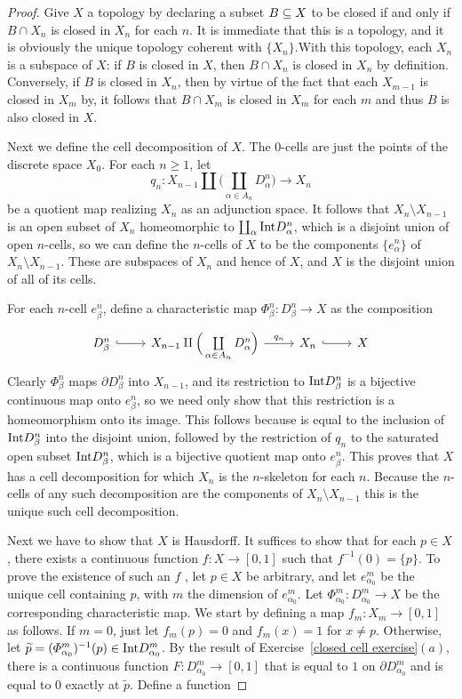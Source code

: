 \begin{proof}
Give $X$ a topology by declaring a subset $B\subseteq X$ to be closed if and only if
$B\cap X_n$ is closed in $X_n$ for each $n$. It is immediate that this is a topology, and it is obviously the unique topology coherent with $\{X_n\}$.With this topology, each $X_n$ is a subspace of $X$: if $B$ is closed in $X$, then $B\cap X_n$ is closed in $X_n$ by definition. Conversely, if $B$ is closed in $X_n$, then by virtue of the fact that each $X_{m-1}$ is closed in $X_m$ by, it follows that $B\cap X_m$ is closed in $X_m$ for each $m$ and thus $B$ is also closed in $X$.\par
Next we define the cell decomposition of $X$. The $0$-cells are just the points of the discrete space $X_0$. For each $n\geq 1$, let
\[q_n:X_{n-1}\amalg\Big(\coprod_{\alpha\in A_n}D^n_\alpha\Big)\to X_n\]
be a quotient map realizing $X_n$ as an adjunction space. It follows that
$X_n\setminus X_{n-1}$ is an open subset of $X_n$ homeomorphic to $\coprod_\alpha\mathrm{Int} D_\alpha^n$, which is a disjoint union of open $n$-cells, so we can define the $n$-cells of $X$ to be the components $\{e^n_\alpha\}$
of $X_n\setminus X_{n-1}$. These are subspaces of $X_n$ and hence of $X$, and $X$ is the disjoint union of all of its cells.\par
For each $n$-cell $e^n_\beta$, define a characteristic map $\varPhi^n_\beta:D^n_\beta\to X$ as the composition
\[\begin{tikzcd}
D^n_\beta\ar[r,hook]&X_{n-1}\amalg\Big(\coprod\limits_{\alpha\in A_n}D^n_\alpha\Big)\ar[r,"q_n"]&X_n\ar[r,hook]&X
\end{tikzcd}\]
Clearly $\varPhi^n_\beta$ maps $\partial D^n_\beta$ into $X_{n-1}$, and its restriction to $\mathrm{Int} D^n_\beta$ is a bijective continuous map onto $e^n_\beta$, so we need only show that this restriction is a homeomorphism
onto its image. This follows because is equal to the inclusion of $\mathrm{Int} D^n_\beta$ into the disjoint union, followed by the restriction of $q_n$ to the saturated open subset $\mathrm{Int} D^n_\beta$, which is a bijective quotient map onto $e^n_\beta$. This proves that $X$ has a cell decomposition for which $X_n$ is the $n$-skeleton for each $n$. Because the $n$-cells of any such decomposition are the components of $X_n\setminus X_{n-1}$ this is the unique such cell decomposition.\par
Next we have to show that $X$ is Hausdorff. It suffices to show that for each $p\in X$, there exists a continuous function $f:X\to[0,1]$ such that $f^{-1}(0)=\{p\}$. To prove the existence of such an $f$ , let $p\in X$ be arbitrary, and let $e^m_{\alpha_0}$ be the unique cell containing $p$, with $m$ the dimension of $e^m_{\alpha_0}$. Let $\varPhi^m_{\alpha_0}:D^m_{\alpha_0}\to X$ be the corresponding characteristic map. We start by defining a map $f_m:X_m\to[0,1]$ as follows. If $m=0$, just let $f_m(p)=0$ and $f_m(x)=1$ for $x\neq p$. Otherwise, let $\widetilde{p}=(\varPhi^m_{\alpha_0})^{-1}(p)\in\mathrm{Int} D^m_{\alpha_0}$. By the result of Exercise~\ref{closed cell exercise}$(a)$, there is a continuous function $F:D^m_{\alpha_0}\to[0,1]$ that is equal to $1$ on $\partial D^m_{\alpha_0}$ and is equal to $0$ exactly at $\widetilde{p}$. Define a function

\end{proof}
